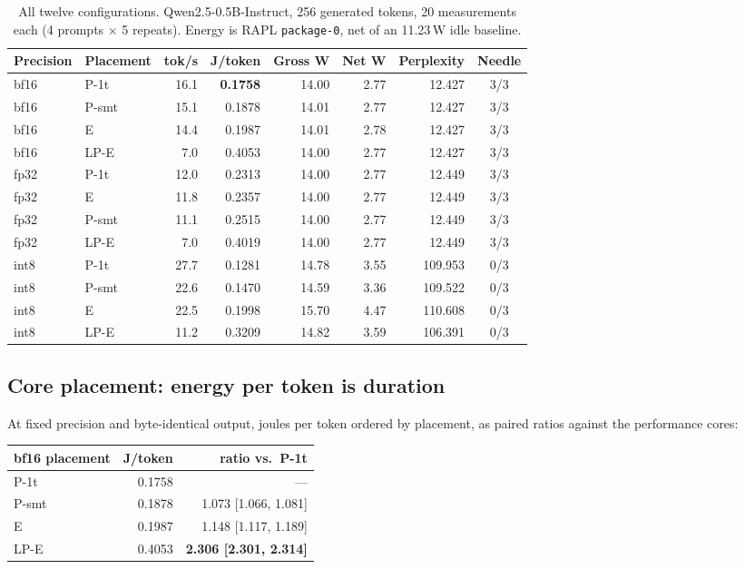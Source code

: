 \documentclass[journal]{IEEEtran}
\begin{document}
\begin{table}[t]
\centering
\caption{All twelve configurations. Qwen2.5-0.5B-Instruct, 256 generated
tokens, 20 measurements each (4 prompts $\times$ 5 repeats). Energy is RAPL
\texttt{package-0}, net of an 11.23\,W idle baseline.}
\label{tab:main}
\begin{tabular}{llrrrrrc}
\toprule
Precision & Placement & tok/s & J/token & Gross W & Net W & Perplexity & Needle \\
\midrule
bf16 & P-1t  & 16.1 & \textbf{0.1758} & 14.00 & 2.77 & 12.427 & 3/3 \\
bf16 & P-smt & 15.1 & 0.1878 & 14.01 & 2.77 & 12.427 & 3/3 \\
bf16 & E     & 14.4 & 0.1987 & 14.01 & 2.78 & 12.427 & 3/3 \\
bf16 & LP-E  &  7.0 & 0.4053 & 14.00 & 2.77 & 12.427 & 3/3 \\
\midrule
fp32 & P-1t  & 12.0 & 0.2313 & 14.00 & 2.77 & 12.449 & 3/3 \\
fp32 & E     & 11.8 & 0.2357 & 14.00 & 2.77 & 12.449 & 3/3 \\
fp32 & P-smt & 11.1 & 0.2515 & 14.00 & 2.77 & 12.449 & 3/3 \\
fp32 & LP-E  &  7.0 & 0.4019 & 14.00 & 2.77 & 12.449 & 3/3 \\
\midrule
int8 & P-1t  & 27.7 & 0.1281 & 14.78 & 3.55 & 109.953 & 0/3 \\
int8 & P-smt & 22.6 & 0.1470 & 14.59 & 3.36 & 109.522 & 0/3 \\
int8 & E     & 22.5 & 0.1998 & 15.70 & 4.47 & 110.608 & 0/3 \\
int8 & LP-E  & 11.2 & 0.3209 & 14.82 & 3.59 & 106.391 & 0/3 \\
\bottomrule
\end{tabular}
\end{table}

\subsection{Core placement: energy per token is duration}
\label{sec:islands}
At fixed precision and byte-identical output, joules per token ordered by
placement, as paired ratios against the performance cores:

\begin{center}
\begin{tabular}{lrr}
\toprule
bf16 placement & J/token & ratio vs.\ P-1t \\
\midrule
P-1t  & 0.1758 & --- \\
P-smt & 0.1878 & 1.073 [1.066, 1.081] \\
E     & 0.1987 & 1.148 [1.117, 1.189] \\
LP-E  & 0.4053 & \textbf{2.306 [2.301, 2.314]} \\
\bottomrule
\end{tabular}
\end{center}
\end{document}
